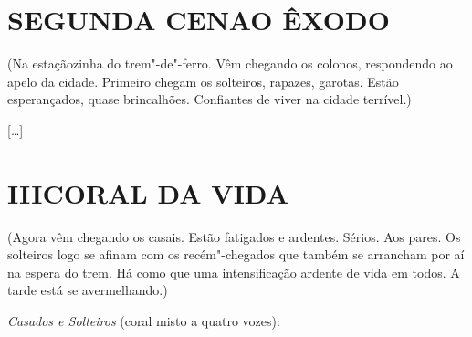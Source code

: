 \pagebreak

\section*{SEGUNDA CENA\break O ÊXODO}

\hfill\parbox{150pt}{
(Na estaçãozinha do trem"-de"-ferro. Vêm chegando os colonos, respondendo
ao apelo da cidade. Primeiro chegam os solteiros, rapazes, garotas.
Estão esperançados, quase brincalhões. Confiantes de viver na cidade
terrível.)
}

{[}\ldots{}{]}

\section*{III\break CORAL DA VIDA}

\hfill\parbox{150pt}{
(Agora vêm chegando os casais. Estão fatigados e ardentes. Sérios. Aos
pares. Os solteiros logo se afinam com os recém"-chegados que também se
arrancham por aí na espera do trem. Há como que uma intensificação
ardente de vida em todos. A tarde está se avermelhando.)
}

\emph{Casados e Solteiros} (coral misto a quatro vozes):

